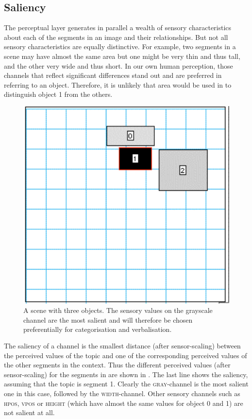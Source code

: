 \subsection{Saliency}

The perceptual layer generates in parallel a wealth of 
sensory characteristics about each of the segments in 
an image and their relationships. But not all sensory 
characteristics are equally distinctive. For example, two 
segments in a scene may have almost the same area but 
one might be very thin and thus tall, and the other very wide
and thus short. In our own human perception, those channels
that reflect significant differences stand out and are preferred
in referring to an object. Therefore, it is unlikely that area would be 
used in  to distinguish object 1 from 
the others. 

\begin{figure}[h]
  \centerline{\includegraphics[width=.45\textwidth]{chap3/figs/recscene.pdf}}
\caption{\label{rect1b}A scene with three objects. The
sensory values on the grayscale channel are the most salient 
and will therefore be chosen preferentially for categorisation
and verbalisation.}
\end{figure}

The saliency of a channel 
is the smallest distance (after sensor-scaling) between the perceived
values of the topic and one of the corresponding perceived values of the 
other segments in the context. 
Thus the different perceived values (after sensor-scaling)
for the segments in  are shown in 
. The last line shows the saliency, assuming that 
the topic is segment 1.  Clearly the \textsc{gray}-channel is the most salient
one in this case, followed by the \textsc{width}-channel. Other 
sensory channels such as \textsc{hpos}, \textsc{vpos} or \textsc{height} (which have almost the same 
values for object 0 and 1) are not salient at all. 

